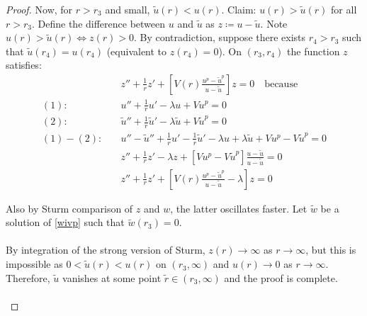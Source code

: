 \begin{lemma}
\begin{proof}
Now, for $r>r_3$ and small, $\tilde u(r)<u(r)$. Claim: $u(r)>\tilde u(r)$ for all $r>r_3$. Define the difference between $u$ and $\tilde u$ as $z\coloneqq u-\tilde u$. Note $u(r)>\tilde u(r)\iff z(r)>0$. By contradiction, suppose there exists $r_4>r_3$ such that $\tilde u(r_4)=u(r_4)$ (equivalent to $z(r_4)=0$). On $(r_3,r_4)$ the function $z$ satisfies:
\begin{align*}
	&z''+\frac{1}{r}z'+\left[V(r)\frac{u^p-\tilde u^p}{u-\tilde u}\right]z = 0\quad\mathrm{because} \\
	(1):\quad &u'' + \frac{1}{r}u' -\lambda u + Vu^p = 0 \\
	(2):\quad &\tilde u'' + \frac{1}{r}\tilde u' -\lambda\tilde u + V\tilde u^p = 0\\
	(1) - (2):\quad &u'' - \tilde u'' + \frac{1}{r}u' - \frac{1}{r}\tilde u' -\lambda u + \lambda\tilde u + Vu^p - V\tilde u^p = 0\\
	 &z'' + \frac{1}{r}z' -\lambda z + \left[Vu^p - V\tilde u^p\right]
	\frac{u-\tilde u}{u-\tilde u} = 0\\
	 &z'' + \frac{1}{r}z' + \left[V(r)\frac{u^p-\tilde u^p}{u-\tilde u}-\lambda\right]z = 0
\end{align*}


Also by Sturm comparison of $z$ and $w$, the latter oscillates faster. Let $\tilde w$ be a solution of \eqref{wivp} such that $\tilde w(r_3)=0$.
\\ \\

By integration of the strong version of Sturm, $z(r)\to\infty$ as $r\to\infty$, but this is impossible as $0<\tilde u(r)<u(r)$ on $(r_3,\infty)$ and $u(r)\to0$ as $r\to\infty$. Therefore, $\tilde u$ vanishes at some point $\tilde r\in(r_3,\infty)$ and the proof is complete.
\\ \\


\end{proof}
\end{lemma}

